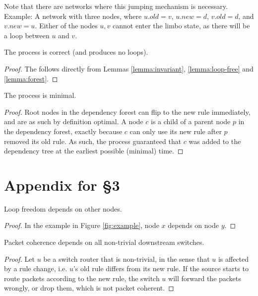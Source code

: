 Note that there are networks where this jumping mechanism is necessary. Example: A network with three nodes, where $u.old = v$, $u.new = d$, $v.old = d$, and $v.new = u$. Either of the nodes $u,v$ cannot enter the limbo state, as there will be a loop between $u$ and $v$.

\begin{lemma}\label{lemma:correctness} The process is correct (and produces no loops).
\end{lemma}

\begin{proof} The follows directly from Lemmas \ref{lemma:invariant}, \ref{lemma:loop-free} and \ref{lemma:forest}.
\end{proof}

\begin{lemma}\label{lemma:minimal} The process is minimal.
\end{lemma}

\begin{proof}
Root nodes in the dependency forest can flip to the new rule immediately, and are as such by definition optimal. A node $c$ is a child of a parent node $p$ in the dependency forest, exactly because $c$ can only use its new rule after $p$ removed its old rule. As such, the process guaranteed that $c$ was added to the dependency tree at the earliest possible (minimal) time.
\end{proof}

\section{Appendix for \S3}
\label{sec:app2}


\begin{lemma}\label{lemma:imp loop-free} Loop freedom depends on other nodes.
\end{lemma}

\begin{proof}
In the example in Figure \ref{fig:example}, node $x$ depends on node $y$.
\end{proof}

\begin{lemma}\label{lemma:imp packet coherence} Packet coherence depends on all non-trivial downstream switches.
\end{lemma}

\begin{proof} Let $u$ be a switch router that is non-trivial, in the sense that $u$ is affected by a rule change, i.e. $u$'s old rule differs from its new rule. If the source starts to route packets according to the new rule, the switch $u$ will forward the packets wrongly, or drop them, which is not packet coherent.
\end{proof}


